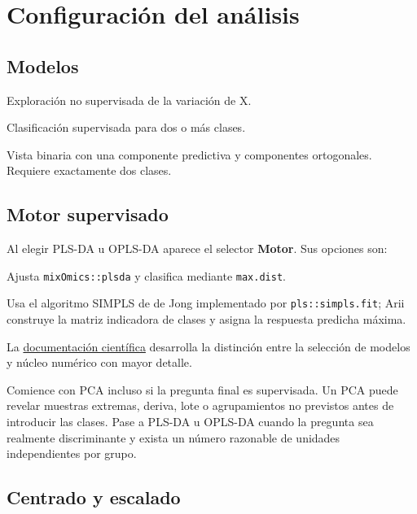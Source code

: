 \documentclass[11pt,a4paper,openany]{report}
\newcommand{\menu}[1]{\textbf{#1}}
\newcommand{\code}[1]{\texttt{#1}}
\begin{document}
\chapter{Configuración del análisis}

\section{Modelos}

\begin{description}[leftmargin=3.2cm,style=nextline]
  \item[PCA] Exploración no supervisada de la variación de X.
  \item[PLS-DA] Clasificación supervisada para dos o más clases.
  \item[OPLS-DA] Vista binaria con una componente predictiva y componentes
  ortogonales. Requiere exactamente dos clases.
\end{description}

\section{Motor supervisado}\label{sec:motor-supervisado}

Al elegir PLS-DA u OPLS-DA aparece el selector \menu{Motor}. Sus opciones son:

\begin{description}[leftmargin=3.2cm,style=nextline]
  \item[mixOmics] Ajusta \code{mixOmics::plsda} y clasifica mediante
  \code{max.dist}.
  \item[SIMPLS] Usa el algoritmo SIMPLS de de Jong implementado por
  \code{pls::simpls.fit}; Arii construye la matriz indicadora de clases y asigna
  la respuesta predicha máxima.
\end{description}

La \href{https://github.com/EXCI5ION/Arii/blob/main/docs/pdf/Arii-documentacion-cientifica-versión1.2.0.pdf}{documentación científica} desarrolla la distinción entre la selección de modelos y núcleo numérico con mayor detalle.

Comience con PCA incluso si la pregunta final es supervisada. Un PCA puede
revelar muestras extremas, deriva, lote o agrupamientos no previstos antes de
introducir las clases. Pase a PLS-DA u OPLS-DA cuando la pregunta sea realmente
discriminante y exista un número razonable de unidades independientes por grupo.

\section{Centrado y escalado}
\end{document}

